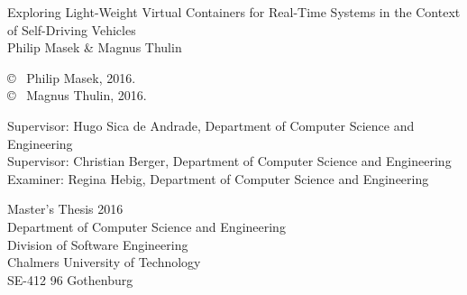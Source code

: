 \newpage
\thispagestyle{plain}
\vspace*{4.5cm}
Exploring Light-Weight Virtual Containers for Real-Time Systems in the Context of Self-Driving Vehicles\\
Philip Masek \& Magnus Thulin \setlength{\parskip}{1cm}

\copyright ~ Philip Masek, 2016. \setlength{\parskip}{1cm}\\[0.0cm]
\copyright ~ Magnus Thulin, 2016. \setlength{\parskip}{1cm}

Supervisor: Hugo Sica de Andrade, Department of Computer Science and Engineering\\Supervisor: Christian Berger, Department of Computer Science and Engineering\\
Examiner: Regina Hebig, Department of Computer Science and Engineering \setlength{\parskip}{1cm}

Master's Thesis 2016\\	%
Department of Computer Science and Engineering\\
Division of Software Engineering\\
Chalmers University of Technology\\
SE-412 96 Gothenburg\\

\vfill
